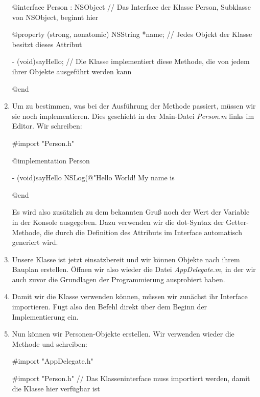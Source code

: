 \documentclass[parskip=half, final]{scrreprt}
\begin{document}
\begin{lecture}
\begin{enumerate}
\begin{objclst}
@interface Person : NSObject // Das Interface der Klasse Person, Subklasse von NSObject, beginnt hier

@property (strong, nonatomic) NSString *name; // Jedes Objekt der Klasse besitzt dieses Attribut

- (void)sayHello; // Die Klasse implementiert diese Methode, die von jedem ihrer Objekte ausgeführt werden kann

@end
\end{objclst}

\item Um zu bestimmen, was bei der Ausführung der Methode passiert, müssen wir sie noch implementieren. Dies geschieht in der Main-Datei \emph{Person.m} links im Editor. Wir schreiben:

\begin{objclst}
#import "Person.h"

@implementation Person

- (void)sayHello {
    NSLog(@"Hello World! My name is %
}

@end
\end{objclst}

Es wird also zusätzlich zu dem bekannten Gruß noch der Wert der Variable  in der Konsole ausgegeben. Dazu verwenden wir die dot-Syntax der Getter-Methode, die durch die Definition des Attributs  im Interface automatisch generiert wird.

\item Unsere Klasse ist jetzt einsatzbereit und wir können Objekte nach ihrem Bauplan erstellen. Öffnen wir also wieder die Datei \emph{AppDelegate.m}, in der wir auch zuvor die Grundlagen der Programmierung ausprobiert haben.

\item Damit wir die Klasse verwenden können, müssen wir zunächst ihr Interface importieren. Fügt also den Befehl  direkt über dem Beginn der Implementierung  ein.

\item Nun können wir Personen-Objekte erstellen. Wir verwenden wieder die Methode  und schreiben:

\begin{objclst}
#import "AppDelegate.h"

#import "Person.h" // Das Klasseninterface muss importiert werden, damit die Klasse hier verfügbar ist


\end{objclst}
\end{enumerate}
\end{lecture}
\end{document}

